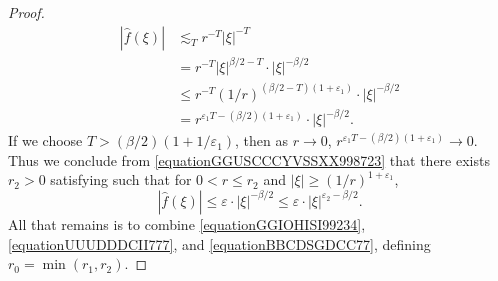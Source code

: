 \documentclass[dvipsnames,letterpaper,12pt]{article}
\numberwithin{equation}{section}
\numberwithin{theorem}{section}
\begin{document}
\begin{proof}
\begin{equation}
\begin{split}
        |\widehat{f}(\xi)| &\lesssim_T r^{-T} |\xi|^{-T}\\
        &= r^{-T} |\xi|^{\beta/2 - T} \cdot |\xi|^{-\beta/2}\\
        &\leq r^{-T} (1/r)^{(\beta/2 - T)(1 + \varepsilon_1)} \cdot |\xi|^{-\beta/2}\\
        &= r^{\varepsilon_1 T - (\beta/2)(1 + \varepsilon_1)} \cdot |\xi|^{-\beta/2}.
    \end{split}
    \end{equation}
    If we choose $T > (\beta/2)(1 + 1/\varepsilon_1)$, then as $r \to 0$, $r^{\varepsilon_1 T - (\beta/2)(1 + \varepsilon_1)} \to 0$. Thus we conclude from \eqref{equationGGUSCCCYVSSXX998723} that there exists $r_2 > 0$ satisfying such that for $0 < r \leq r_2$ and $|\xi| \geq (1/r)^{1+\varepsilon_1}$,
    \begin{equation} \label{equationBBCDSGDCC77}
        |\widehat{f}(\xi)| \leq \varepsilon \cdot |\xi|^{-\beta/2} \leq \varepsilon \cdot |\xi|^{\varepsilon_2-\beta/2}.
    \end{equation}
    All that remains is to combine \eqref{equationGGIOHISI99234}, \eqref{equationUUUDDDCII777}, and \eqref{equationBBCDSGDCC77}, defining $r_0 = \min(r_1,r_2)$.
\end{proof}
\end{document}
